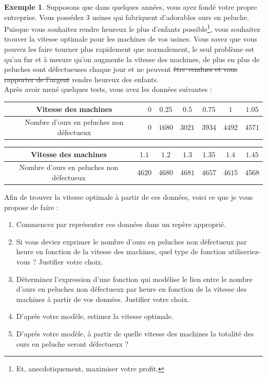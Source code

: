 \documentclass[a4paper,13pt]{scrreprt}
\theoremstyle{plain}
\theoremstyle{definition}
\newtheorem{exe}[subsection]{Exemple}
\begin{document}
\begin{exe} \label{exof10f}
	Supposons que dans quelques années, vous ayez fondé votre propre entreprise. Vous possédez $3$ usines qui fabriquent d'adorables ours en peluche. Puisque vous souhaitez rendre heureux le plus d'enfants possible\footnote{Et, anecdotiquement, maximiser votre profit.}, vous souhaitez trouver la vitesse optimale pour les machines de vos usines. Vous savez que vous pouvez les faire tourner plus rapidement que normalement, le seul problème est qu'au fur et à mesure qu'on augmente la vitesse des machines, de plus en plus de peluches sont défectueuses chaque jour et ne peuvent \sout{être vendues et vous rapporter de l'argent} rendre heureux des enfants. \\
	Après avoir mené quelques tests, vous avez les données suivantes :
	\begin{center}
		\begin{tabular}{|c|c|c|c|c|c|c|}
			\hline
			Vitesse des machines & $0$& $0.25$ & $0.5$ & $0.75$ & $1$ & $1.05$ \\
			\hline
			Nombre d'ours en peluches non défectueux & $0$ & $1680$ & $3021$ & $3934$ & $4492$ & $4571$ \\
			\hline
		\end{tabular}
	\end{center}
	\begin{center}
		\begin{tabular}{|c|c|c|c|c|c|c|}
			\hline
			Vitesse des machines & $1.1$ & $1.2$ & $1.3$ & $1.35$ & $1.4$ & $1.45$ \\
			\hline
			Nombre d'ours en peluches non défectueux & $4620$ & $4680$ & $4681$ & $4657$ & $4615$ & $4568$ \\
			\hline
		\end{tabular}
	\end{center}
	Afin de trouver la vitesse optimale à partir de ces données, voici ce que je vous propose de faire :
	\begin{enumerate}
		\item Commencez par représenter ces données dans un repère approprié.
		\item Si vous deviez exprimer le nombre d'ours en peluches non défectueux par heure en fonction de la vitesse des machines, quel type de fonction utiliseriez-vous ? Justifier votre choix.
		\item Déterminez l'expression d'une fonction qui modélise le lien entre le nombre d'ours en peluches non défectueux par heure en fonction de la vitesse des machines à partir de vos données. Justifier votre choix.
		\item D'après votre modèle, estimez la vitesse optimale.
		\item D'après votre modèle, à partir de quelle vitesse des machines la totalité des ours en peluche seront défectueux ?
	\end{enumerate}
\end{exe}
\end{document}
